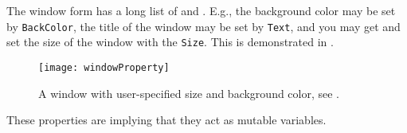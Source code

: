 The window form has a long list of  and . E.g., the background color may be set by \lstinline!BackColor!, the title of the window may be set by \lstinline!Text!, and you may get and set the size of the window with the \lstinline!Size!. This is demonstrated in .
%
%
\begin{figure}
  \centering
  \texttt{[image: windowProperty]}
  \caption{A window with user-specified size and background color, see .}
  \label{fig:windowProperty}
\end{figure}
%
These properties are  implying that they act as mutable variables. 

